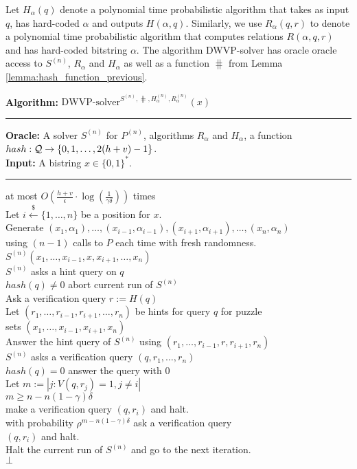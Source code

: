Let $H_{\alpha}(q)$ denote a polynomial time probabilistic algorithm that takes as input $q$,
has hard-coded $\alpha$ and outputs $H(\alpha, q)$.
Similarly, we use $R_{\alpha}(q,r)$ to denote a polynomial time probabilistic algorithm that computes relations
$R(\alpha, q, r)$ and has hard-coded bitstring $\alpha$.
The algorithm DWVP-solver has oracle oracle access to $S^{(n)}$, $R_{\alpha}$ and $H_{\alpha}$ as well as a function $\hash$ from Lemma \ref{lemma:hash_function_previous}.

%
\begin{codeblock}
  \textbf{Algorithm:} $\text{DWVP-solver}^{S^{(n)}, \hash, H_{\alpha}^{(n)}, R_{\alpha}^{(n)}}(x)$
  \medskip
  \hrule
  \textbf{Oracle:}  A solver $S^{(n)}$ for $P^{(n)}$, algorithms $R_{\alpha}$ and $H_{\alpha}$, a function $hash : \mathcal{Q} \rightarrow \{0,1, \dotsc, 2(h+v)-1\}$.\\
  \textbf{Input:} A bistring $x \in \{0,1\}^{*}$.
  \medskip\hrule
  \Repeat at most $O(\frac{h+v}{\epsilon} \cdot \log(\frac{1}{\gamma\delta}))$ times \\
  \IndI Let $i \xleftarrow{\$} \{1, \dotsc, n\}$ be a position for $x$.\\
  \IndI Generate $(x_1, \alpha_1), \dotsc, (x_{i-1}, \alpha_{i-1}), (x_{i+1}, \alpha_{i+1}), \dotsc, (x_n, \alpha_n)$ \\
  \IndI using $(n-1)$ calls to $P$ each time with fresh randomness.\\
  \IndI \Run $S^{(n)}(x_1, \dotsc, x_{i-1}, x, x_{i+1}, \dotsc, x_n)$\\
  \IndII \If $S^{(n)}$ asks a hint query on $q$ \Then \\
  \IndIII \If $hash(q) \neq 0$ \Then abort current run of $S^{(n)}$\\
  \IndIII Ask a verification query $r := H(q)$\\
  \IndIII Let $(r_1, \dotsc, r_{i-1}, r_{i+1}, \dotsc, r_{n})$ be hints for query $q$ for puzzle\\
  \IndIII sets $(x_1, \dotsc, x_{i-1}, x_{i+1}, x_n)$\\
  \IndIII Answer the hint query of $S^{(n)}$ using $(r_1, \dots, r_{i-1}, r, r_{i+1}, r_n)$\\
  \IndII \If $S^{(n)}$ asks a verification query $(q, r_1, \dots, r_n)$ \Then \\
  \IndIII \If $hash(q) = 0$ \Then answer the query with $0$\\
  \IndIII Let $m := |j: V(q,r_j) = 1, j \neq i|$\\
  \IndIII \If $m \geq n - n(1-\gamma)\delta$ \Then \\
  \IndIIII make a verification query $(q, r_i)$ and halt.\\
  \IndIII \Else with probability $\rho^{m - n(1-\gamma)\delta}$ ask a verification query \\
  \IndIIII $(q, r_i)$ and halt. \\
  \IndIII Halt the current run of $S^{(n)}$ and go to the next iteration.\\
  \Return $\bot$
\end{codeblock}

